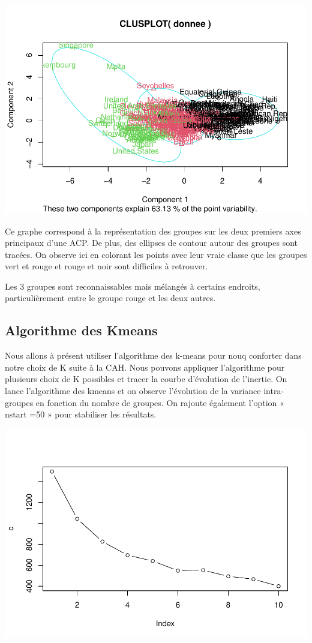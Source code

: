 \documentclass[
]{article}
\begin{document}
\includegraphics{Projet_files/figure-latex/unnamed-chunk-21-1.pdf}

Ce graphe correspond à la représentation des groupes sur les deux
premiers axes principaux d'une ACP. De plus, des ellipses de contour
autour des groupes sont tracées. On observe ici en colorant les points
avec leur vraie classe que les groupes vert et rouge et rouge et noir
sont difficiles à retrouver.

Les 3 groupes sont reconnaissables mais mélangés à certains endroits,
particulièrement entre le groupe rouge et les deux autres.

\hypertarget{algorithme-des-kmeans}{%
\subsection{Algorithme des Kmeans}\label{algorithme-des-kmeans}}

Nous allons à présent utiliser l'algorithme des k-means pour nouq
conforter dans notre choix de K suite à la CAH. Nous pouvons appliquer
l'algorithme pour plusieurs choix de K possibles et tracer la courbe
d'évolution de l'inertie. On lance l'algorithme des kmeans et on observe
l'évolution de la variance intra-groupes en fonction du nombre de
groupes. On rajoute également l'option « nstart =50 » pour stabiliser
les résultats.

\includegraphics{Projet_files/figure-latex/unnamed-chunk-22-1.pdf}
\end{document}
